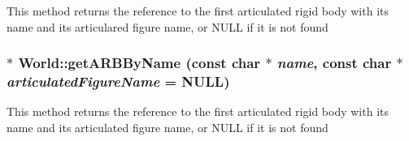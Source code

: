 This method returns the reference to the first articulated rigid body with its name and its articulared figure name, or NULL if it is not found \hypertarget{classCartWheel_1_1Physics_1_1World_a88d5eff7b76c58aaed462d1752de694f}{
\subsubsection[{getARBByName}]{ $\ast$ World::getARBByName (const char $\ast$ {\em name}, \/  const char $\ast$ {\em articulatedFigureName} = {\ttfamily NULL})}}
\label{classCartWheel_1_1Physics_1_1World_a88d5eff7b76c58aaed462d1752de694f}
This method returns the reference to the first articulated rigid body with its name and its articulated figure name, or NULL if it is not found

